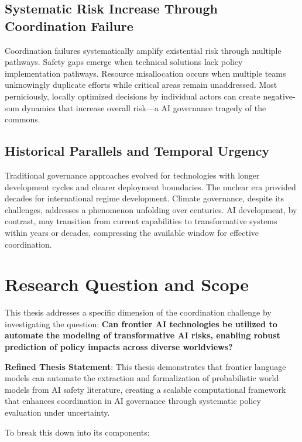 \documentclass[
  11pt,
  letterpaper,
]{book}
\begin{document}
\subsection{Systematic Risk Increase Through Coordination
Failure}\label{sec-risk-increase}

Coordination failures systematically amplify existential risk through
multiple pathways. Safety gaps emerge when technical solutions lack
policy implementation pathways. Resource misallocation occurs when
multiple teams unknowingly duplicate efforts while critical areas remain
unaddressed. Most perniciously, locally optimized decisions by
individual actors can create negative-sum dynamics that increase overall
risk---a AI governance tragedy of the commons.

\subsection{Historical Parallels and Temporal
Urgency}\label{sec-historical-parallels}

Traditional governance approaches evolved for technologies with longer
development cycles and clearer deployment boundaries. The nuclear era
provided decades for international regime development. Climate
governance, despite its challenges, addresses a phenomenon unfolding
over centuries. AI development, by contrast, may transition from current
capabilities to transformative systems within years or decades,
compressing the available window for effective coordination.

\section{Research Question and Scope}\label{sec-research-question}

This thesis addresses a specific dimension of the coordination challenge
by investigating the question: \textbf{Can frontier AI technologies be
utilized to automate the modeling of transformative AI risks, enabling
robust prediction of policy impacts across diverse worldviews?}

\textbf{Refined Thesis Statement}: This thesis demonstrates that
frontier language models can automate the extraction and formalization
of probabilistic world models from AI safety literature, creating a
scalable computational framework that enhances coordination in AI
governance through systematic policy evaluation under uncertainty.

To break this down into its components:
\end{document}
